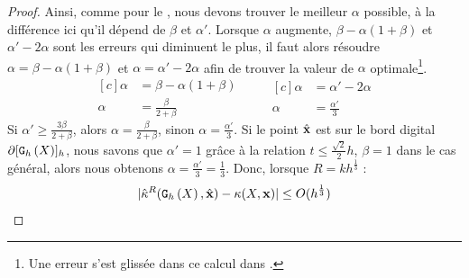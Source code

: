 \begin{proof}
%
Ainsi, comme pour le , nous devons trouver
le meilleur $\alpha$ possible, à la différence ici qu'il dépend de $\beta$ et
$\alpha'$.
%
Lorsque $\alpha$ augmente, $\beta-\alpha(1+\beta)$ et $\alpha'-2\alpha$ sont les
erreurs qui diminuent le plus, il faut alors résoudre $\alpha =
\beta-\alpha(1+\beta)$ et $\alpha = \alpha'-2\alpha$ afin de trouver la valeur
de $\alpha$ optimale\footnote{Une erreur s'est glissée dans ce calcul dans
\cite{DGCI2013}.}.
%
\begin{equation}
\begin{aligned}[c]
  \alpha &= \beta-\alpha(1+\beta)\\
  \alpha &= \frac{\beta}{2+\beta}
\end{aligned}
\qquad
\begin{aligned}[c]
  \alpha &= \alpha' - 2\alpha\\
  \alpha &= \frac{\alpha'}{3}
\end{aligned}
\end{equation}
%
Si $\alpha' \ge \frac{3 \beta}{2 + \beta}$, alors $\alpha = \frac{\beta}{2 +
\beta}$, sinon $\alpha = \frac{\alpha'}{3}$.
%
Si le point $\hat{\mathbf{x}}$ est sur le bord digital $\partial \lbrack \mathtt{G}_{h}\left(X\right) \rbrack_{h}$, nous savons
que $\alpha'=1$ grâce à la relation $t \le \frac{\sqrt{2}}{2}h$, $\beta = 1$
dans le cas général, alors nous obtenons $\alpha = \frac{\alpha'}{3} =
\frac{1}{3}$. Donc, lorsque $R = kh^{\frac{1}{3}}$ :
%
\begin{equation}
  | \hat{\kappa}^{R}(\mathtt{G}_{h}\left(X\right),\hat{\mathbf{x}}) - \kappa(X,\mathbf{x}) | \le O(h^{\frac{1}{3}})
\end{equation}
%
\end{proof}


